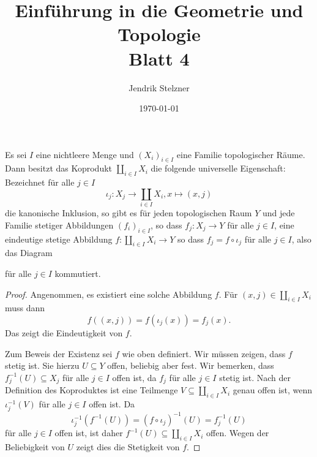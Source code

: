 \documentclass[a4paper,10pt]{article}
\title{\sc Einführung in die Geometrie und Topologie \\ \Large Blatt 4}
\author{Jendrik Stelzner}
\date{\today}
\begin{document}
\maketitle


\begin{lem}\label{lem: universell Koprodukt}
 Es sei $I$ eine nichtleere Menge und $(X_i)_{i \in I}$ eine Familie topologischer Räume. Dann besitzt das Koprodukt $\coprod_{i \in I} X_i$ die folgende universelle Eigenschaft: Bezeichnet für alle $j \in I$
 \[
  \iota_j : X_j \to \coprod_{i \in I} X_i, x \mapsto (x,j)
 \]
 die kanonische Inklusion, so gibt es für jeden topologischen Raum $Y$ und jede Familie stetiger Abbildungen $(f_i)_{i \in I}$, so dass $f_j : X_j \to Y$ für alle $j \in I$, eine eindeutige stetige Abbildung $f : \coprod_{i \in I} X_i \to Y$ so dass $f_j = f \circ \iota_j$ für alle $j \in I$, also das Diagram
 \begin{center}
 \end{center}
für alle $j \in I$ kommutiert.
\end{lem}
\begin{proof}
 Angenommen, es existiert eine solche Abbildung $f$. Für $(x,j) \in \coprod_{i \in I} X_i$ muss dann
 \[
  f((x,j)) = f(\iota_j(x)) = f_j(x).
 \]
 Das zeigt die Eindeutigkeit von $f$.
 
 Zum Beweis der Existenz sei $f$ wie oben definiert. Wir müssen zeigen, dass $f$ stetig ist. Sie hierzu $U \subseteq Y$ offen, beliebig aber fest. Wir bemerken, dass $f_j^{-1}(U) \subseteq X_j$ für alle $j \in I$ offen ist, da $f_j$ für alle $j \in I$ stetig ist. Nach der Definition des Koproduktes ist eine Teilmenge $V \subseteq \coprod_{i \in I} X_i$ genau offen ist, wenn $\iota_j^{-1}(V)$ für alle $j \in I$ offen ist. Da
 \[
  \iota_j^{-1}(f^{-1}(U))
  = (f \circ \iota_j)^{-1}(U)
  = f_j^{-1}(U)
 \]
 für alle $j \in I$ offen ist, ist daher $f^{-1}(U) \subseteq \coprod_{i \in I} X_i$ offen. Wegen der Beliebigkeit von $U$ zeigt dies die Stetigkeit von $f$.
\end{proof}
\end{document}
